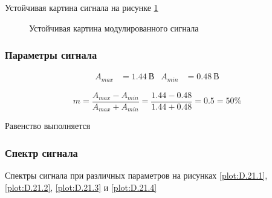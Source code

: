 \documentclass[a4paper, 12pt]{article}
\begin{document}
                Устойчивая картина сигнала на рисунке \ref{plot:D.19}

                \begin{figure}[ht]
                    \centering
                    \begin{minipage}[ht]{0.49\linewidth}
                        \caption{Устойчивая картина модулированного сигнала}
                        \label{plot:D.19}
                    \end{minipage}
                \end{figure}

            \subsubsection{Параметры сигнала}

                \begin{align*}
                    A_{max} &= 1.44~В & A_{min} &= 0.48~В
                \end{align*}

                $$
                    m = \frac{A_{max} - A_{min}}{A_{max} + A_{min}} = \frac{1.44 - 0.48}{1.44 + 0.48} = 0.5 = 50\%
                $$

                Равенство выполняется

            \subsubsection{Спектр сигнала}

                Спектры сигнала при различных параметров на рисунках \ref{plot:D.21.1}, \ref{plot:D.21.2}, \ref{plot:D.21.3} и \ref{plot:D.21.4}
\end{document}
